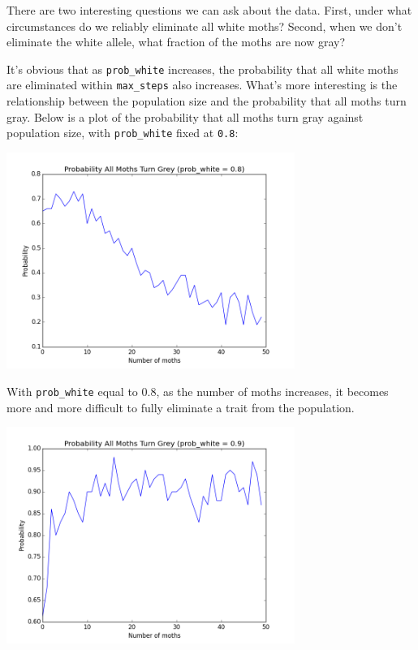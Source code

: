 \documentclass[leqno]{article}
\begin{document}
There are two interesting questions we can ask about the data. First, under what circumstances do we reliably eliminate all white moths? Second, when we don't eliminate the white allele, what fraction of the moths are now gray?

It's obvious that as {\tt prob\_white} increases, the probability that all white moths are eliminated within {\tt max\_steps} also increases. What's more interesting is the relationship between the population size and the probability that all moths turn gray. Below is a plot of the probability that all moths turn gray against population size, with {\tt prob\_white} fixed at {\tt 0.8}: 

\begin{center}
\includegraphics[width=3.7in]{all_moths_8.png} 
\end{center}

With {\tt prob\_white} equal to 0.8, as the number of moths increases, it becomes more and more difficult to fully eliminate a trait from the population.

\begin{center}
\includegraphics[width=3.7in]{all_moths_9.png} 
\end{center}
\end{document}
